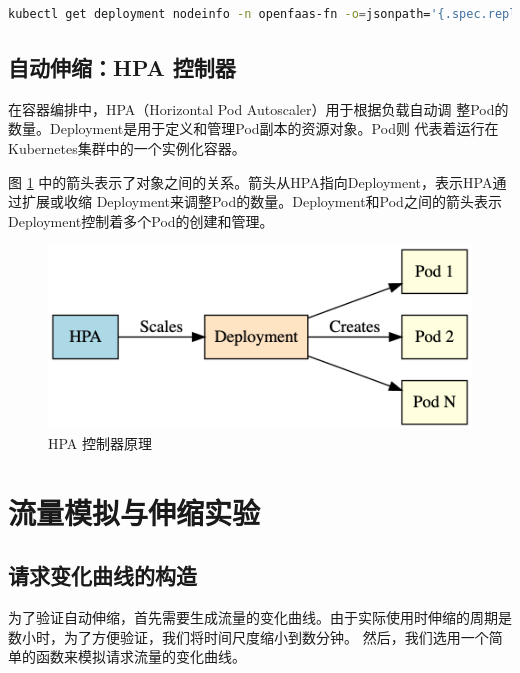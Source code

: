 \documentclass[a4paper,AutoFakeBold,oneside,12pt]{book}
\begin{document}
\begin{lstlisting}[language=bash]
	kubectl get deployment nodeinfo -n openfaas-fn -o=jsonpath='{.spec.replicas}'
\end{lstlisting}


\subsection{自动伸缩：HPA 控制器}

在容器编排中，HPA（Horizontal Pod Autoscaler）用于根据负载自动调
整Pod的数量。Deployment是用于定义和管理Pod副本的资源对象。Pod则
代表着运行在Kubernetes集群中的一个实例化容器\cite{kubernetes_hpa_2023}。

图 \ref{fig:hpa} 中的箭头表示了对象之间的关系。箭头从HPA指向Deployment，表示HPA通过扩展或收缩
Deployment来调整Pod的数量。Deployment和Pod之间的箭头表示
Deployment控制着多个Pod的创建和管理。

\begin{figure}[htbp]
	\centering
	\includegraphics[width=1.0\textwidth]{hpa.png}
	\caption{HPA 控制器原理}
	\label{fig:hpa}
  \end{figure}
\section{流量模拟与伸缩实验}
\subsection{请求变化曲线的构造}

为了验证自动伸缩，首先需要生成流量的变化曲线。由于实际使用时伸缩的周期是
数小时，为了方便验证，我们将时间尺度缩小到数分钟。
然后，我们选用一个简单的函数来模拟请求流量的变化曲线。
\end{document}
